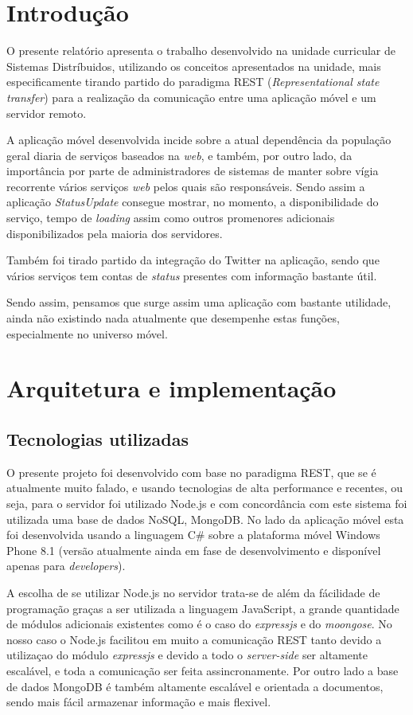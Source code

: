 \documentclass[12pt]{article}
\begin{document}
\newpage

\section{Introdução}

O presente relatório apresenta o trabalho desenvolvido na unidade curricular de Sistemas Distríbuidos, utilizando os conceitos apresentados na unidade, mais especificamente tirando partido do paradigma REST (\textit{Representational state transfer}) para a realização da comunicação entre uma aplicação móvel e um servidor remoto.

	A aplicação móvel desenvolvida incide sobre a atual dependência da população geral diaria de serviços baseados na \textit{web}, e também, por outro lado, da importância por parte de administradores de sistemas  de manter sobre vígia recorrente vários serviços \textit{web} pelos quais são responsáveis. Sendo assim a aplicação \textit{StatusUpdate} consegue mostrar, no momento, a disponibilidade do serviço, tempo de \textit{loading} assim como outros promenores adicionais disponibilizados pela maioria dos servidores.
	
	Também foi tirado partido da integração do Twitter na aplicação, sendo que vários serviços tem contas de \textit{status} presentes com informação bastante útil.
	
	Sendo assim, pensamos que surge assim uma aplicação com bastante  utilidade, ainda não existindo nada atualmente que desempenhe estas funções, especialmente no universo móvel.


\newpage
\section{Arquitetura e implementação}
\subsection{Tecnologias utilizadas}
	O presente projeto foi desenvolvido com base no paradigma REST, que se é atualmente muito falado, e usando tecnologias de alta performance e recentes, ou seja, para o servidor foi utilizado Node.js e com concordância com este sistema foi utilizada uma base de dados NoSQL, MongoDB. No lado da aplicação móvel esta foi desenvolvida usando a linguagem C\# sobre a plataforma móvel Windows Phone 8.1 (versão atualmente ainda em fase de desenvolvimento e disponível apenas para \textit{developers}).
	
	A escolha de se utilizar Node.js no servidor trata-se de além da fácilidade de programação graças a ser utilizada a linguagem JavaScript, a grande quantidade de módulos adicionais existentes como é o caso do \textit{expressjs} e do \textit{moongose}.	 No nosso caso o Node.js facilitou em muito a comunicação REST tanto devido a utilizaçao do módulo \textit{expressjs} e devido a todo o \textit{server-side} ser altamente escalável, e toda a comunicação ser feita assincronamente. Por outro lado a base de dados MongoDB é também altamente escalável e orientada a documentos, sendo mais fácil armazenar informação e mais flexivel. 
	
\end{document}
